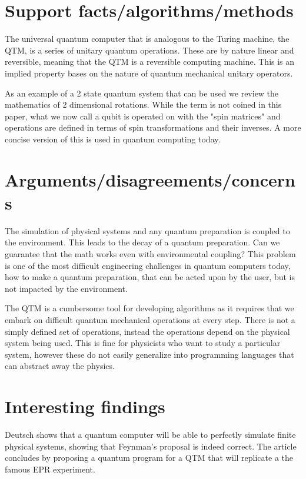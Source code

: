\documentclass{article}
\begin{document}
\section{Support facts/algorithms/methods}

The universal quantum computer that is analogous to the Turing machine, the QTM, is a series of unitary quantum operations. These are by nature linear and reversible, meaning that the QTM is a reversible computing machine. This is an implied property bases on the nature of quantum mechanical unitary operators.

As an example of a 2 state quantum system that can be used we review the mathematics of 2 dimensional rotations. While the term is not coined in this paper, what we now call a qubit is operated on with the "spin matrices" and operations are defined in terms of spin transformations and their inverses. A more concise version of this is used in quantum computing today.



\section{Arguments/disagreements/concerns}

The simulation of physical systems and any quantum preparation is coupled to the environment. This leads to the decay of a quantum preparation. Can we guarantee that the math works even with environmental coupling? This problem is one of the most difficult engineering challenges in quantum computers today, how to make a quantum preparation, that can be acted upon by the user, but is not impacted by the environment.

The QTM is a cumbersome tool for developing algorithms as it requires that we embark on difficult quantum mechanical operations at every step. There is not a simply defined set of operations, instead the operations depend on the physical system being used. This is fine for physicists who want to study a particular system, however these do not easily generalize into programming languages that can abstract away the physics.

\section{Interesting findings}

Deutsch shows that a quantum computer will be able to perfectly simulate finite physical systems, showing that Feynman's proposal is indeed correct. The article concludes by proposing a quantum program for a QTM that will replicate a the famous EPR experiment.
\end{document}
